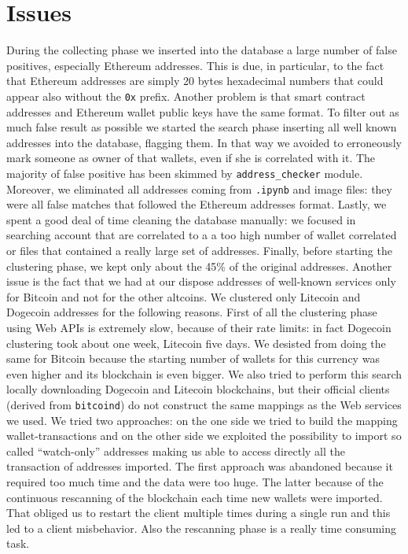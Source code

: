 \section{Issues} \label{sec:issues}
During the collecting phase we inserted into the database a large number of
false positives, especially Ethereum addresses. This is due, in particular, to
the fact that Ethereum addresses are simply 20 bytes hexadecimal numbers that
could appear also without the \texttt{0x} prefix. Another problem is that smart
contract addresses and Ethereum wallet public keys have the same format. To
filter out as much false result as possible we started the search phase
inserting all well known addresses into the database, flagging them. In that way
we avoided to erroneously mark someone as owner of that wallets, even if she is
correlated with it. The majority of false positive has been skimmed by
\texttt{address\_checker} module. Moreover, we eliminated all addresses coming
from \texttt{.ipynb} and image files: they were all false matches that
followed the Ethereum addresses format. Lastly, we spent a good deal of time
cleaning the database manually: we focused in searching account that are
correlated to a a too high number of wallet correlated or files that contained
a really large set of addresses. Finally, before starting the clustering phase,
we kept only about the 45\% of the original addresses.
Another issue is the fact that we had at our dispose addresses
of well-known services only for Bitcoin and not for the other altcoins.
We clustered only Litecoin and Dogecoin addresses for the following reasons.
First of all the clustering phase using Web APIs is extremely slow, because of
their rate limits: in fact Dogecoin clustering took about one week, Litecoin
five days.
We desisted from doing the same for Bitcoin because the starting number of
wallets for this currency was even higher and its blockchain is even bigger. We
also tried to perform this search locally downloading Dogecoin and Litecoin
blockchains, but their official clients (derived from \texttt{bitcoind}) do not
construct the same mappings as the Web services we used. We tried two
approaches: on the one side we tried to build the mapping wallet-transactions
and on the other side we exploited the possibility to import so called
``watch-only'' addresses making us able to access directly all the transaction
of addresses imported. The first approach was abandoned because it
required too much time and the data were too huge. The latter because of the
continuous rescanning of the blockchain each time new wallets were imported.
That obliged us to restart the client multiple times during a single run and
this led to a client misbehavior. Also the rescanning phase is a really
time consuming task.
